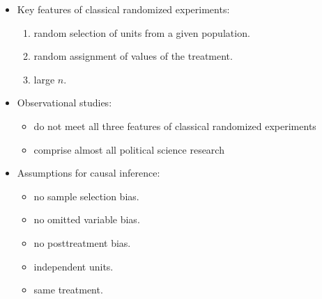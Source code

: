 \documentclass[20pt,landscape,pdftex]{foils}
\begin{document}


\hypersetup{pdfpagetransition=Replace}

\begin{itemize}
\item Key features of classical randomized experiments:\pause
  \begin{enumerate}
  \item random selection of units from a given population.\pause
  \item random assignment of values of the treatment.\pause
  \item large $n$.\pause
  \end{enumerate}
\item Observational studies:\pause
  \begin{itemize}
  \item do not meet all three features of classical randomized
    experiments\pause
  \item comprise almost all political science research
  \end{itemize}

\item Assumptions for causal inference:\pause
  \begin{itemize}
  \item no sample selection bias.\pause
  \item no omitted variable bias.\pause
  \item no posttreatment bias.\pause
  \item independent units.\pause
  \item same treatment.\pause
  \end{itemize}
\end{itemize}



\hypersetup{pdfpagetransition=Replace}
\end{document}
